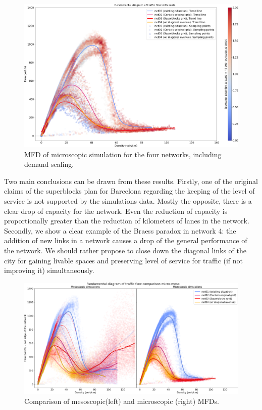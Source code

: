 \documentclass[11pt]{article}
\begin{document}
\begin{figure}[htbp!]
\centering
\includegraphics[width=\textwidth]{code/simulations/charts/MFD02_compar_01-02-03-04_micro.png}
\caption{MFD of microscopic simulation for the four networks, including demand scaling.}
\label{fig:MFD of microscopic simulation for the four proposed networks.}
\end{figure}

Two main conclusions can be drawn from these results. Firstly, one of the original claims of the superblocks plan for Barcelona regarding the keeping of the level of service \citep{Rueda2018} is not supported by the simulations data. Mostly the opposite, there is a clear drop of capacity for the network. Even the reduction of capacity is proportionally greater than the reduction of kilometers of lanes in the network.
Secondly, we show a clear example of the Braess paradox in network 4: the addition of new links in a network causes a drop of the general performance of the network. We should rather propose to close down the diagonal links of the city for gaining livable spaces and preserving level of service for traffic (if not improving it) simultaneously.  
\begin{figure}[htbp!]
\centering
\includegraphics[width=\textwidth]{code/simulations/charts/MFD01_compar_micro-meso.png}
\caption{Comparison of mesoscopic\footnotemark (left) and microscopic (right) MFDs.}
\label{fig:MFD-comp-micro-meso.}
\end{figure}
\end{document}
